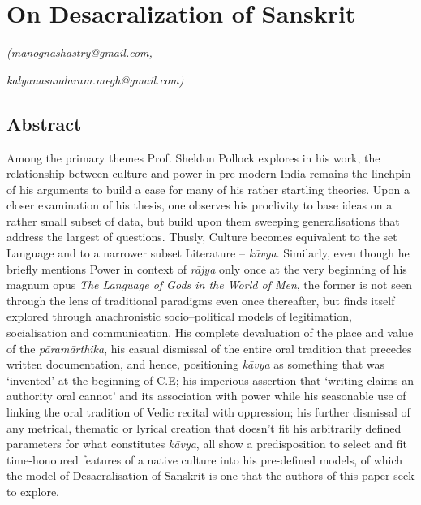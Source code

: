 
\chapter{On Desacralization of Sanskrit}\label{chapter6}


\begin{flushright}
\textit{\sf\em (manognashastry@gmail.com,}

\textit{\sf\em kalyanasundaram.megh@gmail.com)}
\end{flushright}


\section*{Abstract}

Among the primary themes Prof. Sheldon Pollock explores in his work, the relationship between culture and power in pre-modern India remains the linchpin of his arguments to build a case for many of his rather startling theories. Upon a closer examination of his thesis, one observes his proclivity to base ideas on a rather small subset of data, but build upon them sweeping generalisations that address the largest of questions. Thusly, Culture becomes equivalent to the set Language and to a narrower subset Literature – \textit{kāvya}. Similarly, even though he briefly mentions Power in context of \textit{rājya} only once at the very beginning of his magnum opus \textit{The Language of Gods in the World of Men}, the former is not seen through the lens of traditional paradigms even once thereafter, but finds itself explored through anachronistic socio–political models of legitimation, socialisation and communication. His complete devaluation of the place and value of the \textit{pāramārthika}, his casual dismissal of the entire oral tradition that precedes written documentation, and hence, positioning \textit{kāvya} as something that was ‘invented’ at the beginning of C.E; his imperious assertion that ‘writing claims an authority oral cannot’ and its association with power while his seasonable use of linking the oral tradition of Vedic recital with oppression; his further dismissal of any metrical, thematic or lyrical creation that doesn’t fit his arbitrarily defined parameters for what constitutes \textit{kāvya}, all show a predisposition to select and fit time-honoured features of a native culture into his pre-defined models, of which the model of Desacralisation of Sanskrit is one that the authors of this paper seek to explore.

